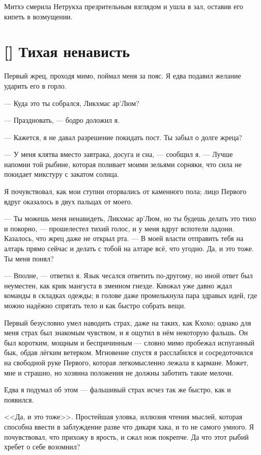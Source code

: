 Митхэ смерила Нетрукха презрительным взглядом и ушла в зал, оставив его кипеть в возмущении.

\section{[] Тихая ненависть}

\textspace

Первый жрец, проходя мимо, поймал меня за пояс.
Я едва подавил желание ударить его в горло.

--- Куда это ты собрался, Ликхмас ар'Люм?

--- Праздновать, --- бодро доложил я.

--- Кажется, я не давал разрешение покидать пост.
Ты забыл о долге жреца?

--- У меня клятва вместо завтрака, досуга и сна, --- сообщил я.
--- Лучше напомни той рыбине, которая поливает моими зельями сорняки, что сила не покидает микстуру с закатом солнца.

Я почувствовал, как мои ступни оторвались от каменного пола;
лицо Первого вдруг оказалось в двух пальцах от моего.

--- Ты можешь меня ненавидеть, Ликхмас ар'Люм, но ты будешь делать это тихо и покорно, --- прошелестел тихий голос, и у меня вдруг вспотели ладони.
Казалось, что жрец даже не открыл рта.
--- В моей власти отправить тебя на алтарь прямо сейчас и делать с тобой на алтаре всё, что угодно.
Да, и это тоже.
Ты меня понял?

--- Вполне, --- ответил я.
Язык чесался ответить по-другому, но иной ответ был неуместен, как крик мангуста в змеином гнезде.
Кинжал уже давно ждал команды в складках одежды;
в голове даже промелькнула пара здравых идей, где можно надёжно спрятать тело и как быстро собрать вещи.

Первый безусловно умел наводить страх, даже на таких, как Кхохо;
однако для меня страх был знакомым чувством, и я ощутил в нём некоторую фальшь.
Он был коротким, мощным и беспричинным --- словно мимо пробежал испуганный бык, обдав лёгким ветерком.
Мгновение спустя я расслабился и сосредоточился на свободной руке Первого, которая легкомысленно лежала в кармане.
Может, мне и страшно, но хозяина положения не должны заботить такие мелочи.

Едва я подумал об этом --- фальшивый страх исчез так же быстро, как и появился.

<<Да, и это тоже>>.
Простейшая уловка, иллюзия чтения мыслей, которая способна ввести в заблуждение разве что дикаря хака, и то не самого умного.
Я почувствовал, что прихожу в ярость, и сжал нож покрепче.
Да что этот рыбий хребет о себе возомнил?

